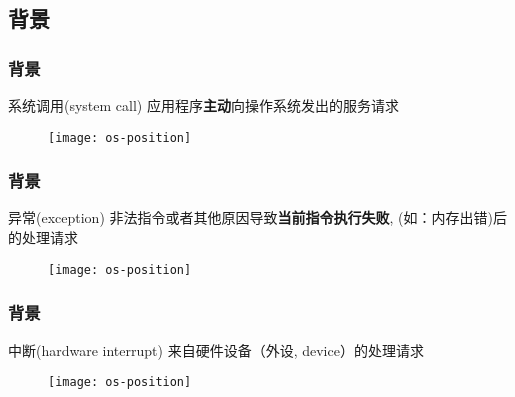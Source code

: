 \subsection{背景} %

\begin{frame}[plain,t]
	
	\frametitle{背景}
	
	
	\begin{block}{系统调用(system call)}
		应用程序\textbf{主动}向操作系统发出的服务请求
	\end{block} 
	
	
	\begin{figure}
		\centering
		\texttt{[image: os-position]}
	\end{figure}
	
\end{frame}

\begin{frame}[plain,t]
	
	\frametitle{背景}
	
	
	\begin{block}{异常(exception)}
		非法指令或者其他原因导致\textbf{当前指令执行失败},
		(如：内存出错)后的处理请求
	\end{block} 
	
	
	\begin{figure}
		\centering
		\texttt{[image: os-position]}
	\end{figure}
	
\end{frame}

\begin{frame}[plain,t]
	
	\frametitle{背景}
	
	
	\begin{block}{中断(hardware interrupt)}
		来自硬件设备（外设, device）的处理请求
	\end{block} 
	
	
	\begin{figure}
		\centering
		\texttt{[image: os-position]}
	\end{figure}
	
\end{frame}

